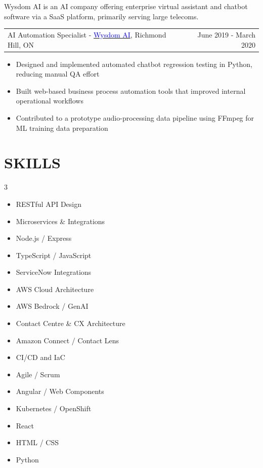 \documentclass[margin]{res}
\begin{document}
\begin{resume}
	Wysdom AI is an AI company offering enterprise virtual assistant and chatbot software via a SaaS platform,
	primarily serving large telecoms.

	\begin{tabular}{p{3in} r} %
		AI Automation Specialist - \href{https://wysdom.ai}{\textcolor{blue}{Wysdom AI}}, Richmond Hill, ON & June 2019 - March 2020
	\end{tabular}
	\begin{itemize} %
		\item Designed and implemented automated chatbot regression testing in Python, reducing manual QA effort
		\item Built web-based business process automation tools that improved internal operational workflows
		\item Contributed to a prototype audio-processing data pipeline using FFmpeg for ML training data preparation

	\end{itemize}
	\section{\textcolor{NavyBlue}{SKILLS}}
	\begin{multicols}{3}
		\begin{itemize}
			\item RESTful API Design
			\item Microservices \& Integrations
			\item Node.js / Express
			\item TypeScript / JavaScript
			\item ServiceNow Integrations
			\item AWS Cloud Architecture
			\item AWS Bedrock / GenAI
			\item Contact Centre \& CX Architecture
			\item Amazon Connect / Contact Lens
			\item CI/CD and IaC
			\item Agile / Scrum
			\item Angular / Web Components
			\item Kubernetes / OpenShift
			\item React
			\item HTML / CSS
			\item Python
		\end{itemize}
	\end{multicols}


\end{resume}
\end{document}
